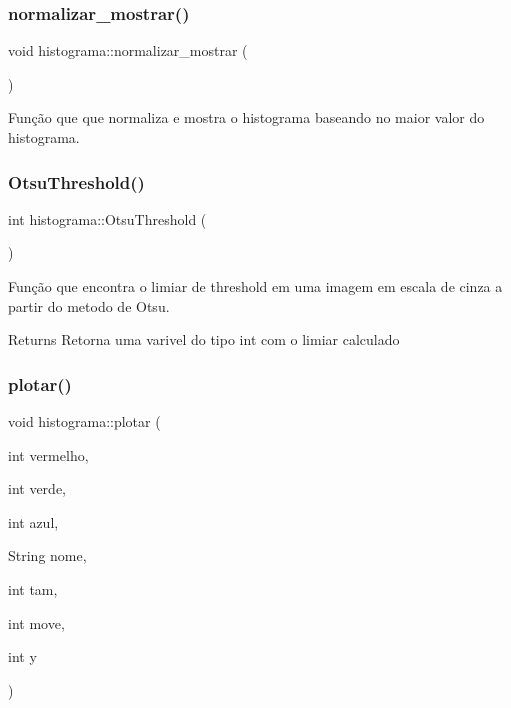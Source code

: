 \subsubsection{\texorpdfstring{normalizar\+\_\+mostrar()}{normalizar\_mostrar()}}
{\footnotesize\ttfamily void histograma\+::normalizar\+\_\+mostrar (\begin{DoxyParamCaption}{ }\end{DoxyParamCaption})}



Função que que normaliza e mostra o histograma baseando no maior valor do histograma. 

\mbox{\label{classhistograma_a218f742ad471f85a5ce049c55a92e2e6}} 
\subsubsection{\texorpdfstring{Otsu\+Threshold()}{OtsuThreshold()}}
{\footnotesize\ttfamily int histograma\+::\+Otsu\+Threshold (\begin{DoxyParamCaption}{ }\end{DoxyParamCaption})}



Função que encontra o limiar de threshold em uma imagem em escala de cinza a partir do metodo de Otsu. 

\begin{DoxyReturn}{Returns}
Retorna uma varivel do tipo int com o limiar calculado 
\end{DoxyReturn}
\mbox{\label{classhistograma_a52b6c866e8ec9de71f6527e1cb1037da}} 
\subsubsection{\texorpdfstring{plotar()}{plotar()}}
{\footnotesize\ttfamily void histograma\+::plotar (\begin{DoxyParamCaption}\item[{int}]{vermelho,  }\item[{int}]{verde,  }\item[{int}]{azul,  }\item[{String}]{nome,  }\item[{int}]{tam,  }\item[{int}]{move,  }\item[{int}]{y }\end{DoxyParamCaption})}



